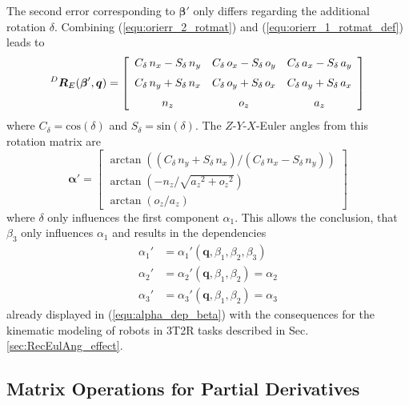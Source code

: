 \documentclass[robotics,article,submit,moreauthors,pdftex]{Definitions/mdpi}
\newcommand{\bm}[1]{\boldsymbol{#1}}
\newcommand{\rotmat}[2]{{{ }^{#1}\boldsymbol{R}}_{#2}}
\begin{document}
The second error corresponding to $\bm{\beta}'$ only differs regarding the additional rotation $\delta$. Combining (\ref{equ:orierr_2_rotmat}) and (\ref{equ:orierr_1_rotmat_def}) leads to
%
\begin{align}
    \rotmat{D}{E}(\bm{\beta}',\bm{q})
    = 
    \left[ \begin {array}{ccc} { C_{\delta}}\,{n_x}-{ S_{\delta}}\,{ n_y}&{ C_{\delta}}\,{o_x}-{ S_{\delta}}\,{o_y}&{ C_{\delta}}\,{ a_x}-{ S_{\delta}}\,{a_y}\\ \noalign{\medskip}{ C_{\delta}}\,{n_y}+ { S_{\delta}}\,{n_x}&{ C_{\delta}}\,{o_y}+{ S_{\delta}}\,{o_x}&{  C_{\delta}}\,{a_y}+{ S_{\delta}}\,{a_x}\\ \noalign{\medskip}{ n_z}&{o_z}&{a_z}\end {array} \right] \nonumber
\end{align}
%
where $C_{\delta}=\mathrm{cos}(\delta)$ and $S_{\delta}=\mathrm{sin}(\delta)$.
The $Z$-$Y$-$X$-Euler angles from this rotation matrix are
%
\begin{equation}
\bm{\alpha}' =
\begin{bmatrix}
\arctan \left( ({  C_{\delta}}\,{n_y}+{ S_{\delta}}\,{n_x}) / ({ C_{\delta}}\,{n_x}-{  S_{\delta}}\,{n_y}) \right) \\
\arctan \left( -{n_z} / \sqrt {{{a_z}}^{2}+{{ o_z}}^{2}} \right) \\
\arctan \left( {o_z} / {a_z} \right)
\end{bmatrix}
\end{equation}
%
where $\delta$  only influences the first component $\alpha_1$.
This allows the conclusion, that $\beta_3$ only influences $\alpha_1$ and results in the dependencies
%
\begin{align}
    \alpha_1'&=\alpha_1'(\bm{q},\beta_1,\beta_2,\beta_3)\\
    \alpha_2'&=\alpha_2'(\bm{q},\beta_1,\beta_2) =\alpha_2\\
    \alpha_3'&=\alpha_3'(\bm{q},\beta_1,\beta_2) =\alpha_3
\end{align}
%
already displayed in (\ref{equ:alpha_dep_beta}) with the consequences for the kinematic modeling of robots in 3T2R tasks described in Sec.\,\ref{sec:RecEulAng_effect}.



\subsection{Matrix Operations for Partial Derivatives}
\label{sec:appendix_gradient_matrix}
\end{document}
